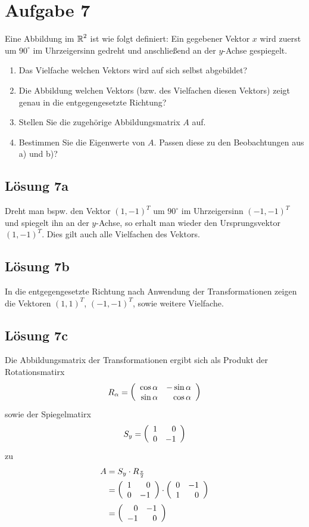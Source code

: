 \documentclass[main.tex]{subfiles}
\begin{document}
\section{Aufgabe 7}
Eine Abbildung im $\R^2$ ist wie folgt definiert:
Ein gegebener Vektor $x$ wird zuerst um $90^\circ$ im Uhrzeigersinn gedreht und anschließend an der $y$-Achse gespiegelt.
\begin{enumerate}
    \item Das Vielfache welchen Vektors wird auf sich selbst abgebildet?
    \item Die Abbildung welchen Vektors (bzw. des Vielfachen diesen Vektors) zeigt genau in die entgegengesetzte Richtung?
    \item Stellen Sie die zugehörige Abbildungsmatrix $A$ auf.
    \item Bestimmen Sie die Eigenwerte von $A$. Passen diese zu den Beobachtungen aus a) und b)?
\end{enumerate}

\subsection{Lösung 7a}
Dreht man bspw. den Vektor $(1, -1)^T$ um $90^\circ$ im Uhrzeigersinn $(-1, -1)^T$ und spiegelt ihn an der $y$-Achse, so erhalt man wieder den Ursprungsvektor $(1, -1)^T$. Dies gilt auch alle Vielfachen des Vektors.

\subsection{Lösung 7b}
In die entgegengesetzte Richtung nach Anwendung der Transformationen zeigen die Vektoren $(1, 1)^T$, $(-1, -1)^T$, sowie weitere Vielfache.

\subsection{Lösung 7c}
Die Abbildungsmatrix der Transformationen ergibt sich als Produkt der Rotationsmatirx
\[
    R_\alpha = \eqmatrix{rr}{\cos\alpha & -\sin\alpha \\ \sin\alpha & \cos\alpha}
\]
sowie der Spiegelmatirx
\[
    S_y = \eqmatrix{rr}{1 & 0\\ 0 & -1}
\]
zu
\begin{align*}
    A &= S_y \cdot R_{\frac{\pi}{2}}\\
    &= \eqmatrix{rr}{1 & 0\\ 0 & -1} \cdot \eqmatrix{rr}{0 & -1\\ 1 & 0} \\
    &= \eqmatrix{rr}{0 & -1 \\ -1 & 0}
\end{align*}
\end{document}

